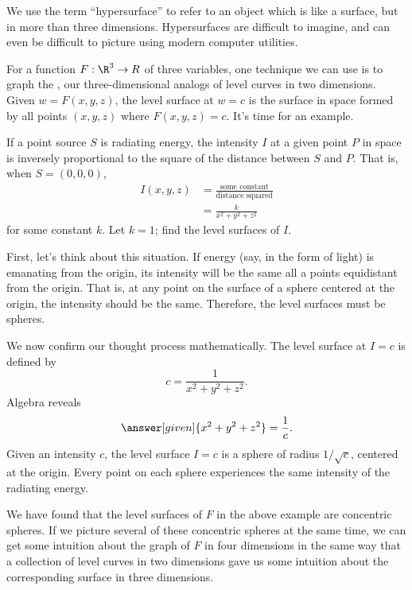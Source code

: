 \documentclass{ximera}
\begin{document}
We use the term ``hypersurface'' to refer to an object which is like a surface, but 
in more than three dimensions.  Hypersurfaces are difficult to imagine, and can 
even be difficult to picture using modern computer utilities. 

For a function $F: \R^3 \to R$ of three variables, one technique we can use is to 
graph the , our three-dimensional analogs of level curves in 
two dimensions. Given $w=F(x,y,z)$, the level surface at $w=c$
is the surface in space formed by all points $(x,y,z)$ where
$F(x,y,z)=c$. It's time for an example.


\begin{example}
  If a point source $S$ is radiating energy, the intensity $I$ at a
  given point $P$ in space is inversely proportional to the square of
  the distance between $S$ and $P$. That is, when $S=(0,0,0)$,
  \begin{align*}
  I(x,y,z) &= \frac{\text{some constant}}{\text{distance squared}}\\
  &=\frac{k}{x^2+y^2+z^2}
  \end{align*}
  for some constant $k$.  Let $k=1$; find the level surfaces of $I$.
  \begin{explanation}
    First, let's think about this situation.  If energy (say, in the form of 
    light) is emanating from the origin,
    its intensity will be the same all a points equidistant from the
    origin. That is, at any point on the surface of a sphere centered
    at the origin, the intensity should be the same. Therefore, the
    level surfaces must be spheres.
    
    We now confirm our thought process mathematically. The level
    surface at $I=c$ is defined by
    \[
    c = \frac{1}{x^2+y^2+z^2}.
    \]
    Algebra reveals
    \[
    \answer[given]{x^2+y^2+z^2} = \frac{1}{c}.
    \]
    Given an intensity $c$, the level surface $I=c$ is a sphere of
    radius $1/\sqrt{c}$, centered at the origin. Every point on each
    sphere experiences the same intensity of the radiating energy.
  
  \end{explanation}
\end{example}

    We have found that the level surfaces of $F$ in the above example 
    are concentric spheres. 
    If we picture several of these concentric spheres at the same time, we 
    can get some intuition about the graph of $F$ in four dimensions in the 
    same way that a collection of level curves in two dimensions gave us 
    some intuition about the corresponding surface in three dimensions.
\end{document}
